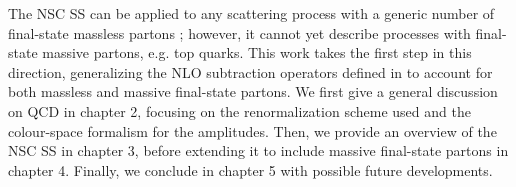 The NSC SS can be applied to any scattering process with a generic number of final-state massless partons \cite{rontsch-2509}; however, it cannot yet describe processes with final-state massive partons, e.g. top quarks. This work takes the first step in this direction, generalizing the NLO subtraction operators defined in \cite{rontsch-2023, rontsch-2503, rontsch-2509} to account for both massless and massive final-state partons. We first give a general discussion on QCD in chapter 2, focusing on the renormalization scheme used and the colour-space formalism for the amplitudes. Then, we provide an overview of the NSC SS in chapter 3, before extending it to include massive final-state partons in chapter 4. Finally, we conclude in chapter 5 with possible future developments.











